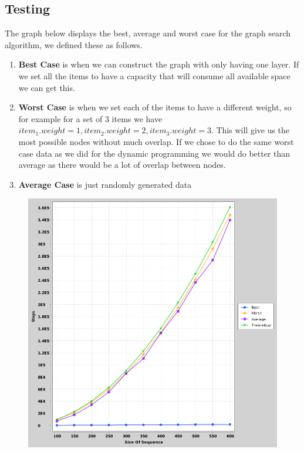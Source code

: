 \documentclass{article}
\begin{document}
		\subsection{Testing}
			The graph below displays the best, average and worst case for the graph search algorithm, we defined these as follows.
			
			\begin{enumerate}
				\item \textbf{Best Case} is when we can construct the graph with only having one layer. If we set all the items to have a capacity that will consume all available space we can get this.
				
				\item \textbf{Worst Case} is when we set each of the items to have a different weight, so for example for a set of 3 items we have $item_1.weight = 1, item_2.weight = 2,item_3.weight = 3$. This will give us the most possible nodes without much overlap. If we chose to do the same worst case data as we did for the dynamic programming we would do better than average as there would be a lot of overlap between nodes.
				
				\item \textbf{Average Case} is just randomly generated data
			\end{enumerate}
			
			\begin{figure}[h]
				\vspace{3mm}
				\begin{center}
					\includegraphics[scale=0.4]{Graph0N.png}
				\end{center}
			\end{figure}
					
\end{document}
